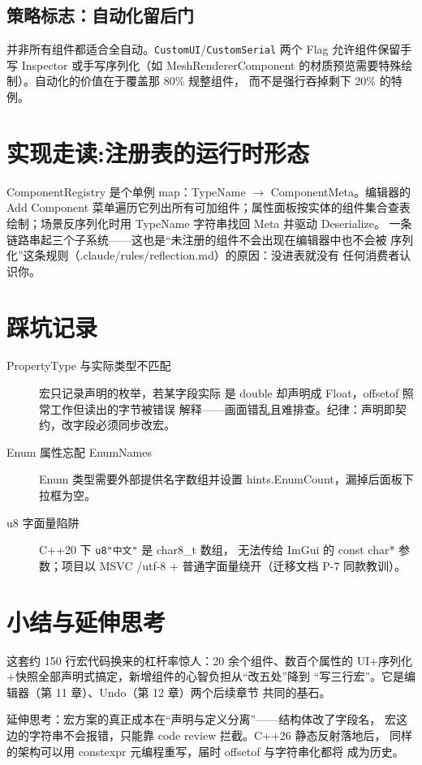 \subsection{策略标志：自动化留后门}

并非所有组件都适合全自动。\texttt{CustomUI}/\texttt{CustomSerial} 两个
Flag 允许组件保留手写 Inspector 或手写序列化（如 MeshRendererComponent
的材质预览需要特殊绘制）。自动化的价值在于覆盖那 80\% 规整组件，
而不是强行吞掉剩下 20\% 的特例。

\section{实现走读:注册表的运行时形态}

ComponentRegistry 是个单例 map：TypeName $\to$ ComponentMeta。编辑器的
Add Component 菜单遍历它列出所有可加组件；属性面板按实体的组件集合查表
绘制；场景反序列化时用 TypeName 字符串找回 Meta 并驱动 Deserialize。
一条链路串起三个子系统——这也是``未注册的组件不会出现在编辑器中也不会被
序列化''这条规则（.claude/rules/reflection.md）的原因：没进表就没有
任何消费者认识你。

\section{踩坑记录}

\begin{description}
  \item[PropertyType 与实际类型不匹配] 宏只记录声明的枚举，若某字段实际
        是 double 却声明成 Float，offsetof 照常工作但读出的字节被错误
        解释——画面错乱且难排查。纪律：声明即契约，改字段必须同步改宏。
  \item[Enum 属性忘配 EnumNames] Enum 类型需要外部提供名字数组并设置
        hints.EnumCount，漏掉后面板下拉框为空。
  \item[u8 字面量陷阱] C++20 下 \texttt{u8"中文"} 是 char8\_t 数组，
        无法传给 ImGui 的 const char* 参数；项目以 MSVC /utf-8 +
        普通字面量绕开（迁移文档 P-7 同款教训）。
\end{description}

\section{小结与延伸思考}

这套约 150 行宏代码换来的杠杆率惊人：20 余个组件、数百个属性的
UI+序列化+快照全部声明式搞定，新增组件的心智负担从``改五处''降到
``写三行宏''。它是编辑器（第 11 章）、Undo（第 12 章）两个后续章节
共同的基石。

延伸思考：宏方案的真正成本在``声明与定义分离''——结构体改了字段名，
宏这边的字符串不会报错，只能靠 code review 拦截。C++26 静态反射落地后，
同样的架构可以用 constexpr 元编程重写，届时 offsetof 与字符串化都将
成为历史。
